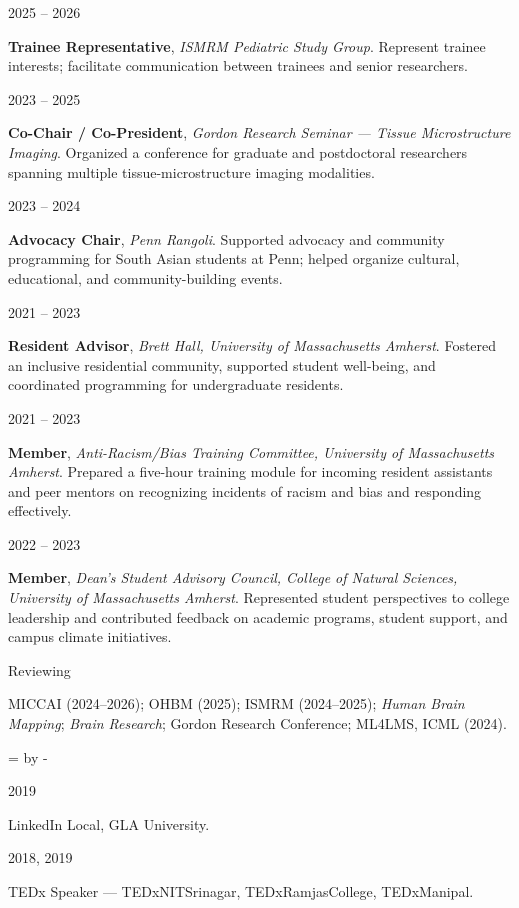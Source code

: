 \documentclass[11pt,letterpaper]{article}
\newlength{\datewidth}\setlength{\datewidth}{1.45in} %
\newlength{\contentwidth}
\newcommand{\reservelines}[1]{\par\begingroup\dimen0=\pagegoal\advance\dimen0 by -\pagetotal\ifdim\dimen0<#1\newpage\fi\endgroup}
\newcommand{\cvsection}[1]{%
  \reservelines{7\baselineskip}%
  \par\addvspace{5pt}\noindent%
  {\large\color{headgray}\textls[140]{\MakeUppercase{#1}}}%
  \par\nointerlineskip\vspace{5pt}\noindent{\color{rulegray}\hrule height 0.6pt}\par\addvspace{5pt}%
}
\newlength{\compactdatewidth}\setlength{\compactdatewidth}{0.9in}
\newlength{\compactsep}\setlength{\compactsep}{0.08in}
\newlength{\compactcontentwidth}
\newcommand{\datedcompact}[2]{%
  \par\vspace{3pt}\noindent
  \begin{minipage}[t]{\compactdatewidth}\RaggedRight\small #1\strut\end{minipage}%
  \hspace{\compactsep}%
  \begin{minipage}[t]{\compactcontentwidth}#2\strut\end{minipage}\par%
}
\begin{document}
\datedcompact{2025 -- 2026}{%
  \textbf{Trainee Representative}, \textit{ISMRM Pediatric Study Group}.
  Represent trainee interests; facilitate communication between trainees and
  senior researchers.}
\datedcompact{2023 -- 2025}{%
  \textbf{Co-Chair / Co-President}, \textit{Gordon Research Seminar --- Tissue Microstructure Imaging}.
  Organized a conference for graduate and postdoctoral researchers spanning
  multiple tissue-microstructure imaging modalities.}
\datedcompact{2023 -- 2024}{%
  \textbf{Advocacy Chair}, \textit{Penn Rangoli}.
  Supported advocacy and community programming for South Asian students at Penn;
  helped organize cultural, educational, and community-building events.}
\datedcompact{2021 -- 2023}{%
  \textbf{Resident Advisor}, \textit{Brett Hall, University of Massachusetts Amherst}.
  Fostered an inclusive residential community, supported student well-being, and
  coordinated programming for undergraduate residents.}
\datedcompact{2021 -- 2023}{%
  \textbf{Member}, \textit{Anti-Racism/Bias Training Committee, University of Massachusetts Amherst}.
  Prepared a five-hour training module for incoming resident assistants and peer
  mentors on recognizing incidents of racism and bias and responding effectively.}
\datedcompact{2022 -- 2023}{%
  \textbf{Member}, \textit{Dean's Student Advisory Council, College of Natural Sciences, University of Massachusetts Amherst}.
  Represented student perspectives to college leadership and contributed feedback
  on academic programs, student support, and campus climate initiatives.}
\datedcompact{Reviewing}{MICCAI (2024--2026); OHBM (2025); ISMRM (2024--2025);
  \textit{Human Brain Mapping}; \textit{Brain Research}; Gordon Research Conference;
  ML4LMS, ICML (2024).}
\par\vspace{5pt}
\cvsection{Outreach \& Public Engagement}
\datedcompact{2019}{LinkedIn Local, GLA University.}
\datedcompact{2018, 2019}{TEDx Speaker --- TEDxNITSrinagar, TEDxRamjasCollege, TEDxManipal.}


\label{cvlastpage}
\end{document}
